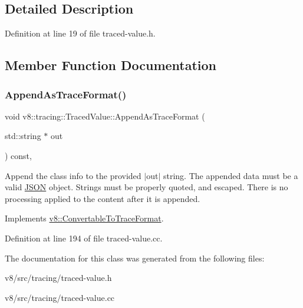 \subsection{Detailed Description}


Definition at line 19 of file traced-\/value.\+h.



\subsection{Member Function Documentation}
\mbox{\label{classv8_1_1tracing_1_1TracedValue_a87e2daa913cf7f97deaeca85dcbbfa3a}} 
\subsubsection{\texorpdfstring{Append\+As\+Trace\+Format()}{AppendAsTraceFormat()}}
{\footnotesize\ttfamily void v8\+::tracing\+::\+Traced\+Value\+::\+Append\+As\+Trace\+Format (\begin{DoxyParamCaption}\item[{std\+::string $\ast$}]{out }\end{DoxyParamCaption}) const\hspace{0.3cm}{\ttfamily [override]}, {\ttfamily [virtual]}}

Append the class info to the provided $\vert$out$\vert$ string. The appended data must be a valid \mbox{\hyperlink{classv8_1_1JSON}{J\+S\+ON}} object. Strings must be properly quoted, and escaped. There is no processing applied to the content after it is appended. 

Implements \mbox{\hyperlink{classv8_1_1ConvertableToTraceFormat_a11f3295df2906e09c1f266049d130013}{v8\+::\+Convertable\+To\+Trace\+Format}}.



Definition at line 194 of file traced-\/value.\+cc.



The documentation for this class was generated from the following files\+:\begin{DoxyCompactItemize}
\item 
v8/src/tracing/traced-\/value.\+h\item 
v8/src/tracing/traced-\/value.\+cc\end{DoxyCompactItemize}
